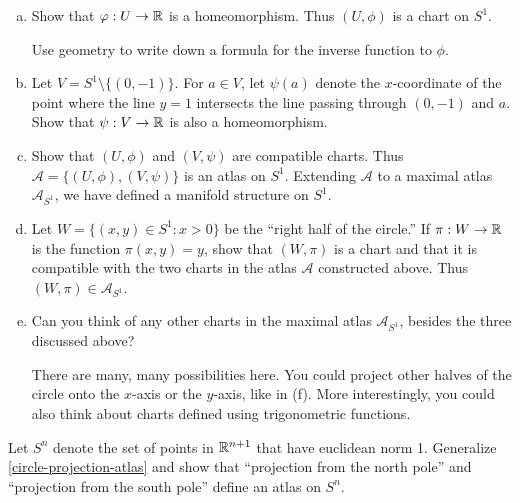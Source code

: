 \begin{exercise}
\begin{enumerate}[(a)]
		\item Show that $\varphi : U \to \mathbb{R}$ is a homeomorphism. Thus $(U, \phi)$ is a chart on $S^1$. 
		\begin{hint} 
			Use geometry to write down a formula for the inverse function to $\phi$. 
		\end{hint}
		
		\item Let $V = S^1 \setminus \{(0,-1)\}$. For $a \in V$, let $\psi(a)$ denote the $x$-coordinate of the point where the line $y = 1$ intersects the line passing through $(0,-1)$ and $a$. Show that $\psi : V \to \mathbb{R}$ is also a homeomorphism. 
		
		\item Show that $(U, \phi)$ and $(V, \psi)$ are compatible charts. Thus $\mathscr{A} = \{(U, \phi), (V, \psi)\}$ is an atlas on $S^1$. Extending $\mathscr{A}$ to a maximal atlas $\mathscr{A}_{S^1}$, we have defined a manifold structure on $S^1$.
		
		\item Let $W = \{ (x,y) \in S^1 : x > 0 \}$ be the ``right half of the circle.'' If $\pi : W \to \mathbb{R}$ is the function $\pi(x,y) = y$, show that $(W,\pi)$ is a chart and that it is compatible with the two charts in the atlas $\mathscr{A}$ constructed above. Thus $(W, \pi) \in \mathscr{A}_{S^1}$. 
		
		\item Can you think of any other charts in the maximal atlas $\mathscr{A}_{S^1}$, besides the three discussed above?
		
		\begin{hint}
			There are many, many possibilities here. You could project other halves of the circle onto the $x$-axis or the $y$-axis, like in (f). More interestingly, you could also think about charts defined using trigonometric functions. 
		\end{hint}
	\end{enumerate}
\end{exercise}

\begin{exercise} \label{sphere-projection-atlas}  
	Let $S^n$ denote the set of points in $\mathbb{R}^{n+1}$ that have euclidean norm 1. Generalize \cref{circle-projection-atlas} and show that ``projection from the north pole'' and ``projection from the south pole'' define an atlas on $S^n$. 
\end{exercise}

